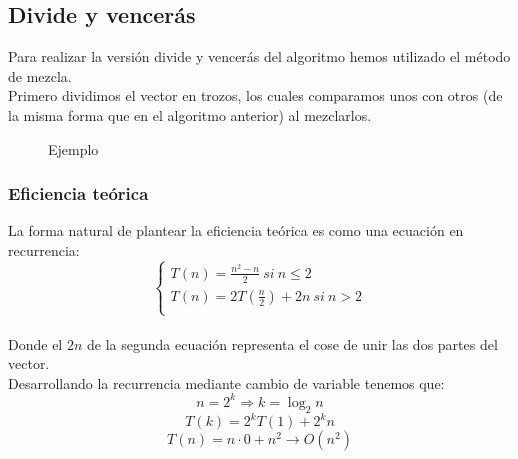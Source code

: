 \newpage

\subsection{Divide y vencerás}
Para realizar la versión divide y vencerás del algoritmo hemos utilizado el método de mezcla.\\

Primero dividimos el vector en trozos, los cuales comparamos unos con otros (de la misma forma que en el algoritmo anterior) al mezclarlos.\\


\begin{figure}[h] 
\centering
	\caption{Ejemplo} 
\end{figure}


\subsubsection{Eficiencia teórica}
La forma natural de plantear la eficiencia teórica es como una ecuación en recurrencia:\\

$$\left\lbrace
	\begin{array}{l}
	T(n) = \frac{n^2 - n}{2}\  si\ n \leq 2\\
	T(n) = 2T(\frac{n}{2}) + 2n\  si\ n > 2 \\
	\end{array}
	\right.$$\\
	
Donde el $2n$ de la segunda ecuación representa el cose de unir las dos partes del vector.\\

Desarrollando la recurrencia mediante cambio de variable tenemos que:\\

$$n=2^k \Rightarrow k = \log_2n$$
$$T(k) = 2^kT(1) + 2^kn$$
$$T(n) = n \cdot 0 + n^2 \rightarrow O(n^2)$$
	

